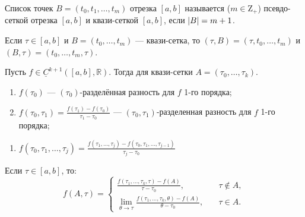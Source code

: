
\begin{definition}
	Список точек $B = (t_0, t_1, \dotsc, t_m)$ отрезка $[a, b]$ называется ($m \in \mathrm{Z}_{+}$) псевдо-сеткой отрезка $[a, b]$ и квази-сеткой $[a, b]$, если $\abs{B} = m + 1$. 
	
	Если $\tau \in [a, b]$ и $B = (t_0, \dotsc, t_m)$ --- квази-сетка, то $(\tau, B) = (\tau, t_0, \dotsc, t_m)$ и $(B, \tau) = (t_0, \dotsc, t_m, \tau)$. 
\end{definition}

\begin{definition}
	Пусть $f \in \underline{C}^{k+1}([a, b], \mathbb{R})$. Тогда для квази-сетки $A = (\tau_0, \dotsc, \tau_k)$. 
	
	\begin{enumerate}[label={\arabic*)}, ref={\arabic*}, start=0]
		\item $f(\tau_0)$ --- $(\tau_0)$-разделённая разность для $f$ 1-го порядка;
		
		\item $f(\tau_0, \tau_1) = \frac{f(\tau_1) - f(\tau_0)}{\tau_1 - \tau_0}$ --- $(\tau_0, \tau_1)$-разделенная разность для $f$ 1-го порядка;
	\end{enumerate}	
	\begin{enumerate}[label={\alph*)}, start=10]
		\item $f(\tau_0, \tau_1, \dotsc, \tau_j) = \frac{f(\tau_1, \dotsc, \tau_j) - f(\tau_0, \tau_1, \dotsc, \tau_{j - 1})}{\tau_j - \tau_0}$
	\end{enumerate}
	
	Если $\tau \in [a, b]$, то:
	\begin{equation*}
		f(A, \tau) = \begin{cases}
					 	\frac{f(\tau_1, \dotsc, \tau_k, \tau) - f(A)}{\tau - \tau_0}, \quad &\tau \not \in A, \\
					 	\lim\limits_{\theta \to \tau}{\frac{f(\tau_1, \dotsc, \tau_k, \theta) - f(A)}{\theta - \tau_0}}, \quad &\tau \in A. 
					 \end{cases}
	\end{equation*}
\end{definition}


